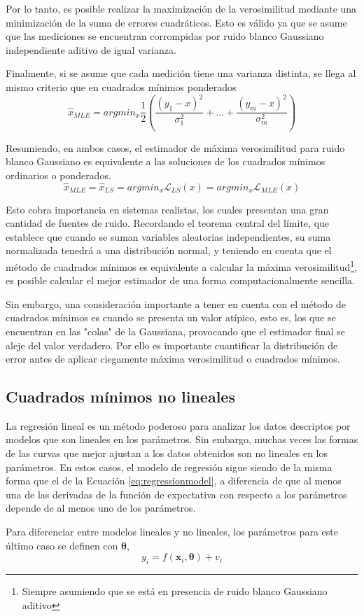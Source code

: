 Por lo tanto, es posible realizar la maximización de la verosimilitud mediante una minimización de la suma de errores cuadráticos. Esto es válido ya que se asume que las mediciones se encuentran corrompidas por ruido blanco Gaussiano independiente aditivo de igual varianza.

Finalmente, si se asume que cada medición tiene una varianza distinta, se llega al mismo criterio que en cuadrados mínimos ponderados
\begin{equation}
    \hat{x}_{MLE} = argmin_x \frac{1}{2}\left(\frac{(y_1-x)^2}{\sigma_1^2}+...+\frac{(y_m-x)^2}{\sigma_m^2}\right)
\end{equation}

Resumiendo, en ambos casos, el estimador de máxima verosimilitud para ruido blanco Gaussiano es equivalente a las soluciones de los cuadrados mínimos ordinarios o ponderados.
\begin{equation}
    \hat{x}_{MLE} = \hat{x}_{LS} = argmin_x\mathscr{L}_{LS}(x) = argmin_x\mathscr{L}_{MLE}(x)
\end{equation}

Esto cobra importancia en sistemas realistas, los cuales presentan una gran cantidad de fuentes de ruido. Recordando el teorema central del límite, que establece que cuando se suman variables aleatorias independientes, su suma normalizada tenedrá a una distribución normal, y teniendo en cuenta que el método de cuadrados mínimos es equivalente a calcular la máxima verosimilitud\footnote{Siempre asumiendo que se está en presencia de ruido blanco Gaussiano aditivo}, es posible calcular el mejor estimador de una forma computacionalmente sencilla.

Sin embargo, una consideración importante a tener en cuenta con el método de cuadrados mínimos es cuando se presenta un valor atípico, esto es, los que se encuentran en las "colas" de la Gaussiana, provocando que el estimador final se aleje del valor verdadero. Por ello es importante cuantificar la distribución de error antes de aplicar ciegamente máxima verosimilitud o cuadrados mínimos.

\subsection{Cuadrados mínimos no lineales}

La regresión lineal es un método poderoso para analizar los datos descriptos por modelos que son lineales en los parámetros. Sin embargo, muchas veces las formas de las curvas que mejor ajustan a los datos obtenidos son no lineales en los parámetros. En estos casos, el modelo de regresión sigue siendo de la misma forma que el de la Ecuación \ref{eq:regressionmodel}, a diferencia de que al menos una de las derivadas de la función de expectativa con respecto a los parámetros depende de al menos uno de los parámetros.

Para diferenciar entre modelos lineales y no lineales, los parámetros para este último caso se definen con $\bm{\theta}$,
\begin{equation}
    y_i = f(\textbf{x}_i, \bm{\theta}) + v_i
    \label{eq:nonlinearregressionmodel}
\end{equation}

